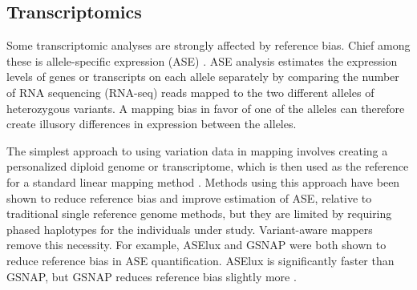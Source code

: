 
\subsection{Transcriptomics}

Some transcriptomic analyses are strongly affected by reference bias.
Chief among these is allele-specific expression (ASE) \cite{Degner2009-vw,Castel2015-ef}.
ASE analysis estimates the expression levels of genes or transcripts on each allele separately by comparing the number of RNA sequencing (RNA-seq) reads mapped to the two different alleles of heterozygous variants.
A mapping bias in favor of one of the alleles can therefore create illusory differences in expression between the alleles.

The simplest approach to using variation data in mapping involves creating a personalized diploid genome or transcriptome, which is then used as the reference for a standard linear mapping method \cite{Turro2011-op,Rozowsky_2011,Bray_2016,Raghupathy2018-sd}.
Methods using this approach have been shown to reduce reference bias and improve estimation of ASE, relative to traditional single reference genome methods, but they are limited by requiring phased haplotypes for the individuals under study.
Variant-aware mappers remove this necessity.
For example, ASElux \cite{Miao2018-ps} and GSNAP \cite{Castel2015-ef} were both shown to reduce reference bias in ASE quantification.
ASElux is significantly faster than GSNAP, but GSNAP reduces reference bias slightly more \cite{Miao2018-ps}.

%

